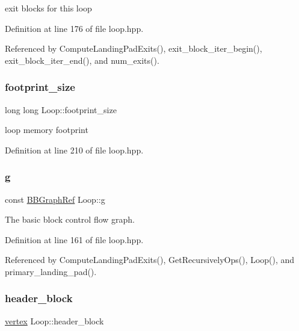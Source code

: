 exit blocks for this loop 



Definition at line 176 of file loop.\+hpp.



Referenced by Compute\+Landing\+Pad\+Exits(), exit\+\_\+block\+\_\+iter\+\_\+begin(), exit\+\_\+block\+\_\+iter\+\_\+end(), and num\+\_\+exits().

\mbox{\label{classLoop_a7a4fbb2bed01020027499ea1a6324914}} 
\subsubsection{\texorpdfstring{footprint\+\_\+size}{footprint\_size}}
{\footnotesize\ttfamily long long Loop\+::footprint\+\_\+size}



loop memory footprint 



Definition at line 210 of file loop.\+hpp.

\mbox{\label{classLoop_a86837f1c0a1b4263e3a98a4d383a8206}} 
\subsubsection{\texorpdfstring{g}{g}}
{\footnotesize\ttfamily const \hyperlink{basic__block_8hpp_a0e7f233d1b83cad0bfd5aa865f0d3532}{B\+B\+Graph\+Ref} Loop\+::g\hspace{0.3cm}{\ttfamily [private]}}



The basic block control flow graph. 



Definition at line 161 of file loop.\+hpp.



Referenced by Compute\+Landing\+Pad\+Exits(), Get\+Recursively\+Ops(), Loop(), and primary\+\_\+landing\+\_\+pad().

\mbox{\label{classLoop_ab97018bd50c8a5923adbc04fb05df554}} 
\subsubsection{\texorpdfstring{header\+\_\+block}{header\_block}}
{\footnotesize\ttfamily \hyperlink{graph_8hpp_abefdcf0544e601805af44eca032cca14}{vertex} Loop\+::header\+\_\+block\hspace{0.3cm}{\ttfamily [private]}}



